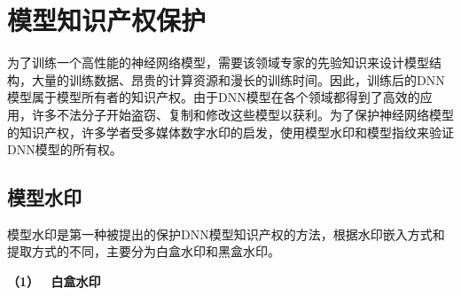 %
%
%
%
%
%
%
%
%
%
%



\section{模型知识产权保护}

为了训练一个高性能的神经网络模型，需要该领域专家的先验知识来设计模型结构，大量的训练数据、昂贵的计算资源和漫长的训练时间。因此，训练后的DNN模型属于模型所有者的知识产权。由于DNN模型在各个领域都得到了高效的应用，许多不法分子开始盗窃、复制和修改这些模型以获利。为了保护神经网络模型的知识产权\cite{JFYZ202205002,WXAQ202202001}，许多学者受多媒体数字水印的启发，使用模型水印和模型指纹来验证DNN模型的所有权。

\subsection{模型水印}

模型水印是第一种被提出的保护DNN模型知识产权的方法，根据水印嵌入方式和提取方式的不同，主要分为白盒水印和黑盒水印。

\noindent\textbf{（1） \  白盒水印   }

